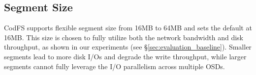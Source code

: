 
\subsection{Segment Size} CodFS supports flexible segment size from
16MB to 64MB and sets the default at 16MB. This size is chosen to fully
utilize both the network bandwidth and disk throughput, as shown in our 
experiments (see \S\ref{sec:evaluation_baseline}). Smaller segments
lead to more disk I/Os and degrade the write throughput, while larger 
segments cannot fully leverage the I/O parallelism across multiple OSDs. 


